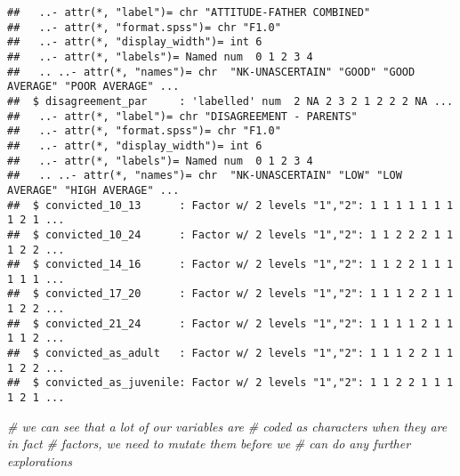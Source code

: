 \documentclass[]{tufte-handout}
\newenvironment{Shaded}{}{}
\newcommand{\CommentTok}[1]{\textcolor[rgb]{0.38,0.63,0.69}{\textit{#1}}}
\begin{document}
\begin{verbatim}
##   ..- attr(*, "label")= chr "ATTITUDE-FATHER COMBINED"
##   ..- attr(*, "format.spss")= chr "F1.0"
##   ..- attr(*, "display_width")= int 6
##   ..- attr(*, "labels")= Named num  0 1 2 3 4
##   .. ..- attr(*, "names")= chr  "NK-UNASCERTAIN" "GOOD" "GOOD AVERAGE" "POOR AVERAGE" ...
##  $ disagreement_par     : 'labelled' num  2 NA 2 3 2 1 2 2 2 NA ...
##   ..- attr(*, "label")= chr "DISAGREEMENT - PARENTS"
##   ..- attr(*, "format.spss")= chr "F1.0"
##   ..- attr(*, "display_width")= int 6
##   ..- attr(*, "labels")= Named num  0 1 2 3 4
##   .. ..- attr(*, "names")= chr  "NK-UNASCERTAIN" "LOW" "LOW AVERAGE" "HIGH AVERAGE" ...
##  $ convicted_10_13      : Factor w/ 2 levels "1","2": 1 1 1 1 1 1 1 1 2 1 ...
##  $ convicted_10_24      : Factor w/ 2 levels "1","2": 1 1 2 2 2 1 1 1 2 2 ...
##  $ convicted_14_16      : Factor w/ 2 levels "1","2": 1 1 2 2 1 1 1 1 1 1 ...
##  $ convicted_17_20      : Factor w/ 2 levels "1","2": 1 1 1 2 2 1 1 1 2 2 ...
##  $ convicted_21_24      : Factor w/ 2 levels "1","2": 1 1 1 1 2 1 1 1 1 2 ...
##  $ convicted_as_adult   : Factor w/ 2 levels "1","2": 1 1 1 2 2 1 1 1 2 2 ...
##  $ convicted_as_juvenile: Factor w/ 2 levels "1","2": 1 1 2 2 1 1 1 1 2 1 ...
\end{verbatim}

\begin{Shaded}
\begin{Highlighting}[]
\CommentTok{# we can see that a lot of our variables are}
\CommentTok{# coded as characters when they are in fact}
\CommentTok{# factors, we need to mutate them before we}
\CommentTok{# can do any further explorations}
\end{Highlighting}
\end{Shaded}
\end{document}
